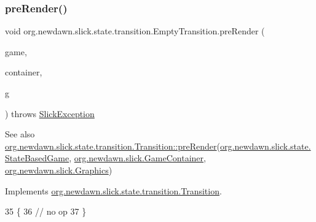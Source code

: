 \subsubsection{\texorpdfstring{pre\+Render()}{preRender()}}
{\footnotesize\ttfamily void org.\+newdawn.\+slick.\+state.\+transition.\+Empty\+Transition.\+pre\+Render (\begin{DoxyParamCaption}\item[{\mbox{\hyperlink{classorg_1_1newdawn_1_1slick_1_1state_1_1_state_based_game}{State\+Based\+Game}}}]{game,  }\item[{\mbox{\hyperlink{classorg_1_1newdawn_1_1slick_1_1_game_container}{Game\+Container}}}]{container,  }\item[{\mbox{\hyperlink{classorg_1_1newdawn_1_1slick_1_1_graphics}{Graphics}}}]{g }\end{DoxyParamCaption}) throws \mbox{\hyperlink{classorg_1_1newdawn_1_1slick_1_1_slick_exception}{Slick\+Exception}}\hspace{0.3cm}{\ttfamily [inline]}}

\begin{DoxySeeAlso}{See also}
\mbox{\hyperlink{interfaceorg_1_1newdawn_1_1slick_1_1state_1_1transition_1_1_transition_ab8b0668c059830d938575d1a0b08bd93}{org.\+newdawn.\+slick.\+state.\+transition.\+Transition\+::pre\+Render}}(\mbox{\hyperlink{classorg_1_1newdawn_1_1slick_1_1state_1_1_state_based_game}{org.\+newdawn.\+slick.\+state.\+State\+Based\+Game}}, \mbox{\hyperlink{classorg_1_1newdawn_1_1slick_1_1_game_container}{org.\+newdawn.\+slick.\+Game\+Container}}, \mbox{\hyperlink{classorg_1_1newdawn_1_1slick_1_1_graphics}{org.\+newdawn.\+slick.\+Graphics}}) 
\end{DoxySeeAlso}


Implements \mbox{\hyperlink{interfaceorg_1_1newdawn_1_1slick_1_1state_1_1transition_1_1_transition_ab8b0668c059830d938575d1a0b08bd93}{org.\+newdawn.\+slick.\+state.\+transition.\+Transition}}.


\begin{DoxyCode}
35                                                                                                           \{
36         \textcolor{comment}{// no op}
37     \}
\end{DoxyCode}
\mbox{\label{classorg_1_1newdawn_1_1slick_1_1state_1_1transition_1_1_empty_transition_a354222c590151b34c62fbc02d56f30e8}} 
